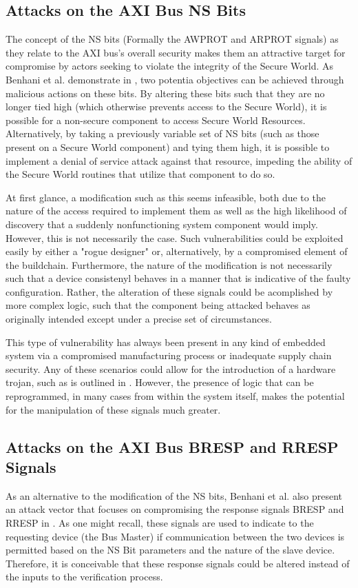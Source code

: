 \documentclass[journal]{IEEEtran}
\begin{document}
\subsection{Attacks on the AXI Bus NS Bits}
The concept of the NS bits (Formally the AWPROT and ARPROT signals) as they relate to the
AXI bus's overall security makes them an attractive target for compromise by actors 
seeking to violate the integrity of the Secure World. As Benhani et al. demonstrate in 
\cite{benhani_security_2019}, two potentia objectives can be achieved through malicious 
actions on these bits. By altering these bits such that they are no longer tied high 
(which otherwise prevents access to the Secure World), it is possible for a non-secure 
component to access Secure World Resources. Alternatively, by taking a previously variable
set of NS bits (such as those present on a Secure World component) and tying them high, it
is possible to implement a denial of service attack against that resource, impeding the 
ability of the Secure World routines that utilize that component to do so.

At first glance, a modification such as this seems infeasible, both due to the nature of
the access required to implement them as well as the high likelihood of discovery that a
suddenly nonfunctioning system component would imply. However, this is not necessarily the
case. Such vulnerabilities could be exploited easily by either a "rogue designer" or,
alternatively, by a compromised element of the buildchain. Furthermore, the nature of the
modification is not necessarily such that a device consistenyl behaves in a manner that is
indicative of the faulty configuration. Rather, the alteration of these signals could be
acomplished by more complex logic, such that the component being attacked behaves as
originally intended except under a precise set of circumstances.

This type of vulnerability has always been present in any kind of embedded system via a
compromised manufacturing process or inadequate supply chain security. Any of these
scenarios could allow for the introduction of a hardware trojan, such as is outlined in
\cite{bhunia_hardware_2014}. However, the presence of logic that can be reprogrammed, in
many cases from within the system itself, makes the potential for the manipulation of
these signals much greater.


\subsection{Attacks on the AXI Bus BRESP and RRESP Signals}
As an alternative to the modification of the NS bits, Benhani et al. also present an
attack vector that focuses on compromising the response signals BRESP and RRESP in 
\cite{benhani_security_2019}. As one might recall, these signals are used to indicate to
the requesting device (the Bus Master) if communication between the two devices is
permitted based on the NS Bit parameters and the nature of the slave device. Therefore, it
is conceivable that these response signals could be altered instead of the inputs to the
verification process. 
\end{document}
